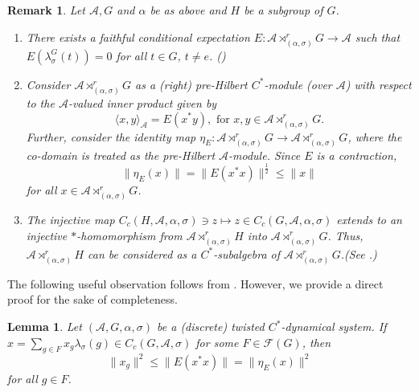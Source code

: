 \documentclass{amsart}
\numberwithin{equation}{section}
\newcommand{\1}{\mathbf{1}}
\newcommand{\mA}{\mathcal{A}}
\newtheorem{lemma}[theorem]{Lemma}
\newtheorem{remark}[theorem]{Remark}
\begin{document}
\begin{remark}\label{r-eta-relation}
Let $\mA, G$ and $\alpha$ be as above and $H$ be a subgroup of $G$. 
\begin{enumerate}

\item There exists a faithful conditional expectation $E:\mA
  \rtimes^{r}_{(\alpha,\sigma)}G \rightarrow \mA $ such that
  $E(\lambda^{G}_{\sigma}(t))=0$ for all $t\in G$, $t \neq
  e$. (\cite[Theorem 2.2]{B})

\item Consider $\mA \rtimes^{r}_{(\alpha,\sigma)}G$ as a (right) pre-Hilbert
$C^*$-module (over $\mA$) with respect to the $\mA$-valued inner product
  given by
\[
\langle x,y\rangle_{\mA}=E(x^*y),\,\, \text{for}\,\, x,y\in \mA \rtimes^{r}_{(\alpha,\sigma)}G.
\]
Further, consider the identity map $\eta_{E}: \mA
\rtimes^{r}_{(\alpha,\sigma)}G \rightarrow \mA
\rtimes^{r}_{(\alpha,\sigma)}G$, where the co-domain is treated as the
pre-Hilbert $\mA$-module. Since $E$ is a contraction,
\[
\|\eta_{E}(x)\| =\|E(x^*x)\|^{\frac{1}{2}}\leq \|x\|
\]
for all $x\in \mA \rtimes^{r}_{(\alpha,\sigma)}G$.

\item The injective map $C_{c}(H,\mA,\alpha,\sigma) \ni z \mapsto z\in
  C_{c}(G,\mA,\alpha,\sigma)$ extends to an injective $*$-homomorphism
  from $\mA \rtimes^{r}_{(\alpha,\sigma)}H$ into $\mA
  \rtimes^{r}_{(\alpha,\sigma)}G$. Thus, $\mA
  \rtimes^{r}_{(\alpha,\sigma)}H$ can be considered as a
  $C^*$-subalgebra of $\mA \rtimes^{r}_{(\alpha,\sigma)}G$.\hfill (See
  \cite[$\S 4.26$]{Z-M}.)
\end{enumerate}
\end{remark}
The following useful observation follows from \cite[Corollary
  2.3]{B}. However, we provide a direct proof for the sake of
completeness.
\begin{lemma}\label{xg-inequality}
Let $(\mA,G,\alpha, \sigma)$ be a (discrete) twisted $C^*$-dynamical
system. If $x= \sum_{g\in F}x_{g}\lambda_{\sigma}(g)\in
C_{c}(G,\mA,\sigma)$ for some $F\in \mathcal{F}(G)$, then
\[
\|x_{g}\|^2\leq \|E(x^*x)\|=\|\eta_{E}(x)\|^{2}
\]
for all $g\in F$.
\end{lemma}
\end{document}
